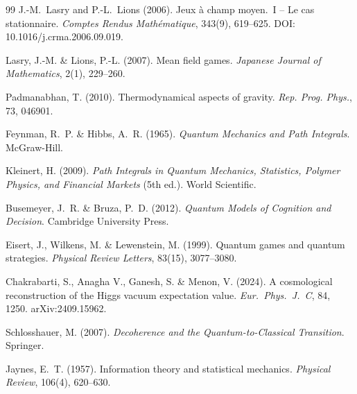 \documentclass[12pt,a4paper]{article}
\theoremstyle{remark}
\begin{document}
\begin{thebibliography}{99}
J.-M.~Lasry and P.-L.~Lions (2006).
\newblock Jeux \`a champ moyen.\ I -- Le cas stationnaire.
\newblock \textit{Comptes Rendus Math\'ematique}, 343(9), 619--625.
\newblock DOI: 10.1016/j.crma.2006.09.019.

Lasry, J.-M. \& Lions, P.-L. (2007).
\newblock Mean field games.
\newblock \textit{Japanese Journal of Mathematics}, 2(1), 229--260.

Padmanabhan, T. (2010).
\newblock Thermodynamical aspects of gravity.
\newblock \textit{Rep. Prog. Phys.}, 73, 046901.

Feynman, R.~P. \& Hibbs, A.~R. (1965).
\newblock \textit{Quantum Mechanics and Path Integrals}.
\newblock McGraw-Hill.

Kleinert, H. (2009).
\newblock \textit{Path Integrals in Quantum Mechanics, Statistics, Polymer Physics, and Financial Markets} (5th ed.).
\newblock World Scientific.


Busemeyer, J.~R. \& Bruza, P.~D. (2012).
\newblock \textit{Quantum Models of Cognition and Decision}.
\newblock Cambridge University Press.

Eisert, J., Wilkens, M. \& Lewenstein, M. (1999).
\newblock Quantum games and quantum strategies.
\newblock \textit{Physical Review Letters}, 83(15), 3077--3080.

Chakrabarti, S., Anagha V., Ganesh, S. \& Menon, V. (2024).
\newblock A cosmological reconstruction of the {H}iggs vacuum expectation value.
\newblock \textit{Eur.\ Phys.\ J.\ C}, 84, 1250. arXiv:2409.15962.

Schlosshauer, M. (2007).
\newblock \textit{Decoherence and the Quantum-to-Classical Transition}.
\newblock Springer.

Jaynes, E.~T. (1957).
\newblock Information theory and statistical mechanics.
\newblock \textit{Physical Review}, 106(4), 620--630.


\end{thebibliography}
\end{document}

